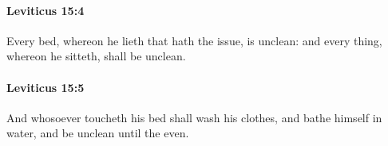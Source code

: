 		\paragraph{Leviticus 15:4} %
			\label{LEVITICUS-15-4}

			Every bed, whereon he lieth that hath the issue, is unclean: and every thing, whereon he sitteth, shall be unclean.


		\paragraph{Leviticus 15:5} %
			\label{LEVITICUS-15-5}

			And whosoever toucheth his bed shall wash his clothes, and bathe himself in water, and be unclean until the even.



